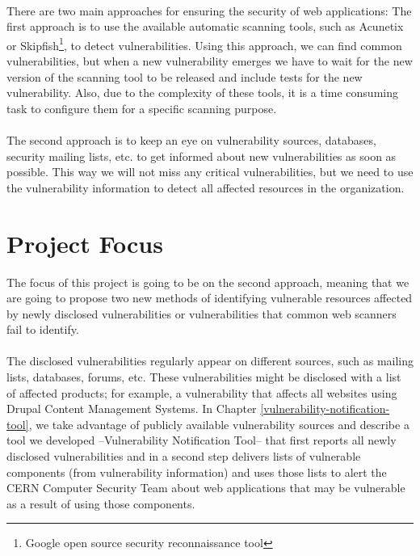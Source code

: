 \paragraph{}
There are two main approaches for ensuring the security of web applications: The first approach is to use the available automatic scanning tools, such as Acunetix or Skipfish\footnote{Google open source security reconnaissance tool}, to detect vulnerabilities. Using this approach, we can find common vulnerabilities, but when a new vulnerability emerges we have to wait for the new version of the scanning tool to be released and include tests for the new vulnerability. Also, due to the complexity of these tools, it is a time consuming task to configure them for a specific scanning purpose. 
\paragraph{}
The second approach is to keep an eye on vulnerability sources, databases, security mailing lists, etc. to get informed about new vulnerabilities as soon as possible. This way we will not miss any critical vulnerabilities, but we need to use the vulnerability information to detect all affected resources in the organization. 
\section{Project Focus}
The focus of this project is going to be on the second approach, meaning that we are going to propose two new methods of identifying vulnerable resources affected by newly disclosed vulnerabilities or vulnerabilities that common web scanners fail to identify. 
\paragraph{}
The disclosed vulnerabilities regularly appear on different sources, such as mailing lists, databases, forums, etc. These vulnerabilities might be disclosed with a list of affected products; for example, a vulnerability that affects all websites using Drupal Content Management Systems. In Chapter \ref{vulnerability-notification-tool}, we take advantage of publicly available vulnerability sources and describe a tool we developed --Vulnerability Notification Tool-- that first reports all newly disclosed vulnerabilities and in a second step delivers lists of vulnerable components (from vulnerability information) and uses those lists to alert the CERN Computer Security Team about web applications that may be vulnerable as a result of using those components.

